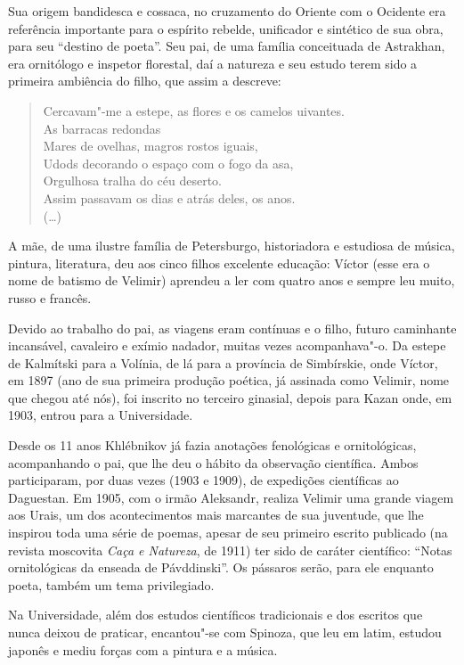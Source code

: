 Sua origem bandidesca e cossaca, no cruzamento do Oriente com o Ocidente
era referência importante para o espírito rebelde, unificador e
sintético de sua obra, para seu ``destino de poeta''. Seu pai, de uma
família conceituada de Astrakhan, era ornitólogo e inspetor florestal, daí a natureza e seu estudo terem sido a primeira ambiência do filho,
que assim a descreve:

\begin{verse}
Cercavam"-me a estepe, as flores e os \qb{}camelos uivantes. \\
As barracas redondas \\
Mares de ovelhas, magros rostos iguais, \\
Udods decorando o espaço com o fogo da \qb{}asa, \\
Orgulhosa tralha do céu deserto. \\
Assim passavam os dias e atrás deles, os anos. \\
(\ldots{})
\end{verse}

A mãe, de uma ilustre família de Petersburgo, historiadora e estudiosa
de música, pintura, literatura, deu aos cinco filhos excelente educação:
Víctor (esse era o nome de batismo de Velimir) aprendeu a ler com quatro
anos e sempre leu muito, russo e francês.

Devido ao trabalho do pai, as viagens eram contínuas e o filho, futuro
caminhante incansável, cavaleiro e exímio nadador, muitas vezes
acompanhava"-o. Da estepe de Kalmítski para a Volínia, de lá para a
província de Simbírskie, onde Víctor, em 1897 (ano de sua primeira
produção poética, já assinada como Velimir, nome que chegou até nós), foi
inscrito no terceiro ginasial, depois para Kazan onde, em 1903, entrou
para a Universidade.

Desde os 11 anos Khlébnikov já fazia anotações fenológicas e
ornitológicas, acompanhando o pai, que lhe deu o hábito da observação
científica. Ambos participaram, por duas vezes (1903 e 1909), de
expedições científicas ao Daguestan. Em 1905, com o irmão Aleksandr,
realiza Velimir uma grande viagem aos Urais, um dos acontecimentos mais
marcantes de sua juventude, que lhe inspirou toda uma série de poemas,
apesar de seu primeiro escrito publicado (na revista moscovita
\emph{Caça e Natureza}, de 1911) ter sido de caráter científico: ``Notas
ornitológicas da enseada de Pávddinski''. Os pássaros serão, para ele
enquanto poeta, também um tema privilegiado.

Na Universidade, além dos estudos científicos tradicionais e dos
escritos que nunca deixou de praticar, encantou"-se com Spinoza, que leu
em latim, estudou japonês e mediu forças com a pintura e a música.

